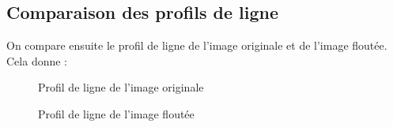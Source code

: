 \documentclass[french,a4paper,10pt]{article}
\begin{document}
    \newpage
    \subsection{Comparaison des profils de ligne}\label{subsec:3.2}

    On compare ensuite le profil de ligne de l'image originale et de l'image floutée.
    Cela donne :
    \begin{figure}[!htb]
        \begin{minipage}{0.48\textwidth}
            \centering
            \caption{Profil de ligne de l'image originale}\label{Fig:prof-peppers-grey-2}
        \end{minipage}\hfill
        \begin{minipage}{0.48\textwidth}
            \centering
            \caption{Profil de ligne de l'image floutée}\label{Fig:prof-peppers-grey-ff1}
        \end{minipage}
    \end{figure}
\end{document}
